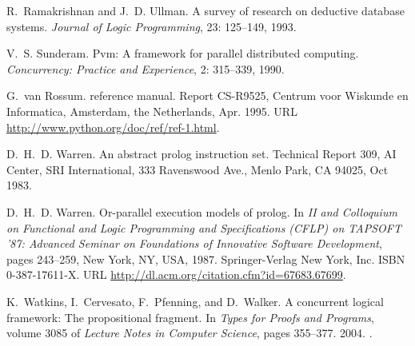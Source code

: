 \documentclass{sigplanconf}
\begin{document}
\begin{thebibliography}{35}
R.~Ramakrishnan and J.~D. Ullman.
\newblock A survey of research on deductive database systems.
\newblock \emph{Journal of Logic Programming}, 23: 125--149, 1993.

V.~S. Sunderam.
\newblock Pvm: A framework for parallel distributed computing.
\newblock \emph{Concurrency: Practice and Experience}, 2: 315--339,
  1990.

G.~{van Rossum}.
 reference manual.
\newblock Report CS-R9525, Centrum voor Wiskunde en Informatica, Amsterdam, the
  Netherlands, Apr. 1995.
\newblock URL \url{http://www.python.org/doc/ref/ref-1.html}.

D.~H.~D. Warren.
\newblock An abstract prolog instruction set.
\newblock Technical Report 309, AI Center, SRI International, 333 Ravenswood
  Ave., Menlo Park, CA 94025, Oct 1983.

D.~H.~D. Warren.
\newblock Or-parallel execution models of prolog.
\newblock In \emph{II and Colloquium on Functional and Logic Programming and
  Specifications (CFLP) on TAPSOFT '87: Advanced Seminar on Foundations of
  Innovative Software Development}, pages 243--259, New York, NY, USA, 1987.
  Springer-Verlag New York, Inc.
\newblock ISBN 0-387-17611-X.
\newblock URL \url{http://dl.acm.org/citation.cfm?id=67683.67699}.

K.~Watkins, I.~Cervesato, F.~Pfenning, and D.~Walker.
\newblock A concurrent logical framework: The propositional fragment.
\newblock In \emph{Types for Proofs and Programs}, volume 3085 of \emph{Lecture
  Notes in Computer Science}, pages 355--377. 2004.
\newblock {}.

\end{thebibliography}
\end{document}
